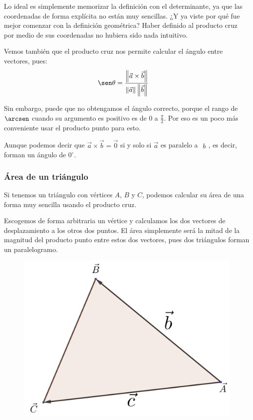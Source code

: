 \documentclass[12pt, fleqn]{report}                             %
\newcommand{\Abs}[1]{\left\lVert #1 \right\lVert}               %
\newcommand{\Vector}[1]                                         %
        { \ensuremath{\begin{matrix}#1\end{matrix}} }               %
\begin{document}
            	Lo ideal es simplemente memorizar la definición con el determinante, ya que las coordenadas de forma explícita no están muy sencillas. ¿Y ya viste por qué fue mejor comenzar con la definición geométrica? Haber definido al producto cruz por medio de sus coordenadas no hubiera sido nada intuitivo.
            	
            	Vemos también que el producto cruz nos permite calcular el ángulo entre vectores, pues:
            	\begin{align}
	            	\sen \theta &= \dfrac{\Abs{\vec{a} \times \vec{b}}}{\Abs{\vec{a}} \Abs{\vec{b}}}
            	\end{align}
            	
            	Sin embargo, puede que no obtengamos el ángulo correcto, porque el rango de $\arcsen$ cuando su argumento es positivo es de $0$ a $\frac{\pi}{2}$. Por eso es un poco más conveniente usar el producto punto para esto.
            	
            	Aunque podemos decir que $\vec{a} \times \vec{b} = \vec{0}$ si y solo si $\vec{a}$ es paralelo a $\Vector{b}$, es decir, forman un ángulo de $0^\circ$.
            
 	            \clearpage
            
                \subsubsection{Área de un triángulo}
                
                Si tenemos un triángulo con vértices $A$, $B$ y $C$, podemos calcular su área de una forma muy sencilla usando el producto cruz.
                
                Escogemos de forma arbitraria un vértice y calculamos los dos vectores de desplazamiento a los otros dos puntos. El área simplemente será la mitad de la magnitud del producto punto entre estos dos vectores, pues dos triángulos forman un paralelogramo.
                
                \begin{figure}[H]
                	\centering
                	\includegraphics[scale=1.3]{triangle.png}
                \end{figure}
                
\end{document}
